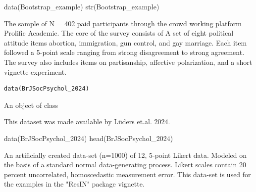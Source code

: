 \documentclass[a4paper]{book}
\begin{document}
%
\begin{Examples}
\begin{ExampleCode}

data(Bootstrap_example)
str(Bootstrap_example)

\end{ExampleCode}
\end{Examples}
%
\begin{Description}
The sample of N = 402 paid participants through the crowd working platform Prolific Academic. The core of the survey consists of A set of eight political attitude items abortion, immigration, gun control, and gay marriage. Each item followed a 5-point scale ranging from strong disagreement to strong agreement. The survey also includes items on partisanship, affective polarization, and a short vignette experiment.
\end{Description}
%
\begin{Usage}
\begin{verbatim}
data(BrJSocPsychol_2024)
\end{verbatim}
\end{Usage}
%
\begin{Format}
An object of class 
\end{Format}
%
\begin{References}
This dataset was made available by Lüders et.al. 2024.
\end{References}
%
\begin{Examples}
\begin{ExampleCode}

data(BrJSocPsychol_2024)
head(BrJSocPsychol_2024)


\end{ExampleCode}
\end{Examples}
%
\begin{Description}
An artificially created data-set (n=1000) of 12, 5-point Likert data. Modeled on the basis of a standard normal data-generating process. Likert scales contain 20 percent uncorrelated, homoscedastic measurement error. This data-set is used for the examples in the "ResIN" package vignette.
\end{Description}
\end{document}
